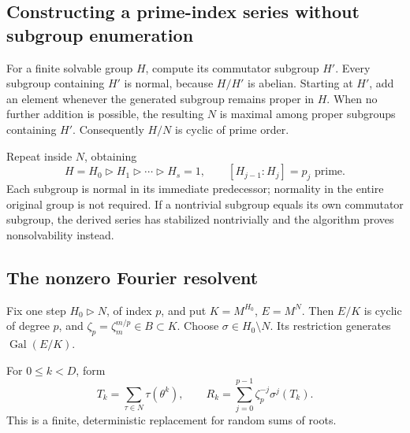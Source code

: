 \documentclass[11pt,letterpaper]{article}
\theoremstyle{definition}\newtheorem{definition}[theorem]{Definition}
\theoremstyle{remark}\newtheorem{remark}[theorem]{Remark}
\newcommand{\Gal}{\operatorname{Gal}}\newcommand{\Fix}{\operatorname{Fix}}
\begin{document}
\subsection{Constructing a prime-index series without subgroup enumeration}
For a finite solvable group \(H\), compute its commutator subgroup \(H'\).
Every subgroup containing \(H'\) is normal, because \(H/H'\) is abelian.
Starting at \(H'\), add an element whenever the generated subgroup remains
proper in \(H\). When no further addition is possible, the resulting \(N\)
is maximal among proper subgroups containing \(H'\). Consequently
\(H/N\) is cyclic of prime order.

Repeat inside \(N\), obtaining
\begin{equation}
 H=H_0\triangleright H_1\triangleright\cdots\triangleright H_s=1,
 \qquad [H_{j-1}:H_j]=p_j\text{ prime}.\label{eq:chain}
\end{equation}
Each subgroup is normal in its immediate predecessor; normality in the entire
original group is not required. If a nontrivial subgroup equals its own
commutator subgroup, the derived series has stabilized nontrivially and the
algorithm proves nonsolvability instead.

\subsection{The nonzero Fourier resolvent}
Fix one step \(H_0\triangleright N\), of index \(p\), and put
\(K=M^{H_0}\), \(E=M^N\). Then \(E/K\) is cyclic of degree \(p\), and
\(\zeta_p=\zeta_m^{m/p}\in B\subset K\). Choose
\(\sigma\in H_0\setminus N\). Its restriction generates \(\Gal(E/K)\).

For \(0\le k<D\), form
\begin{equation}
 T_k=\sum_{\tau\in N}\tau(\theta^k),\qquad
 R_k=\sum_{j=0}^{p-1}\zeta_p^{-j}\sigma^j(T_k).\label{eq:projector}
\end{equation}
This is a finite, deterministic replacement for random sums of roots.
\end{document}

